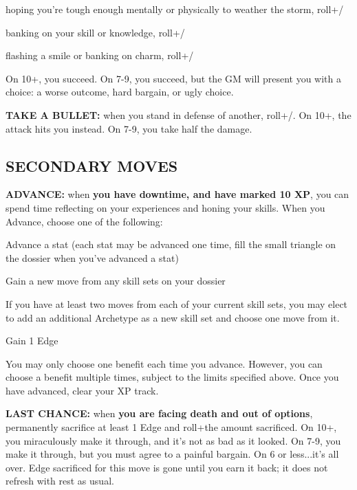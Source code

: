 \documentclass[oneside,10pt]{article}
\begin{document}
\begin{multicols}{2}
\begin{dent}
\tcirc{} hoping you’re tough enough mentally or physically to
weather the storm, roll+\oomph/

\tcirc{} banking on your skill or knowledge,
roll+\mastery/

\tcirc{} flashing a smile or banking on charm,
roll+\flair/
\end{dent}

On 10+, you succeed. On 7-9, you succeed, but the GM will
present you with a choice: a worse outcome, hard bargain,
or ugly choice.

\label{move_takeabullet}
\textbf{TAKE A BULLET:} when you stand in defense of another,
roll+\oomph/. On 10+, the attack hits you instead. On 7-9, you
take half the damage.

\subsection{SECONDARY MOVES}
\label{secondarymoves}

\label{move_advance}
\textbf{ADVANCE:} when \textbf{you have downtime, and have marked
10 XP}, you can spend time reflecting on your experiences
and honing your skills. When you Advance, choose one of
the following:
\begin{dent}

\tcirc{} Advance a stat (each stat may be advanced one time,
fill the small triangle on the dossier when you’ve
advanced a stat)

\tcirc{} Gain a new move from any skill sets on your dossier

\tcirc{} If you have at least two moves from each of your current
skill sets, you may elect to add an additional Archetype as a new
skill set and choose one move from it.

\tcirc{} Gain 1 Edge

\end{dent}

You may only choose one benefit each time you advance.
However, you can choose a benefit multiple times, subject
to the limits specified above. Once you have advanced, clear
your XP track.

\label{move_lastchance}
\textbf{LAST CHANCE:} when \textbf{you are facing death and out of
options}, permanently sacrifice at least 1 Edge and roll+the
amount sacrificed. On 10+, you miraculously make it through,
and it’s not as bad as it looked. On 7-9, you make it through,
but you must agree to a painful bargain. On 6 or less...it’s all
over. Edge sacrificed for this move is gone until you earn it
back; it does not refresh with rest as usual.


\end{multicols}
\end{document}
